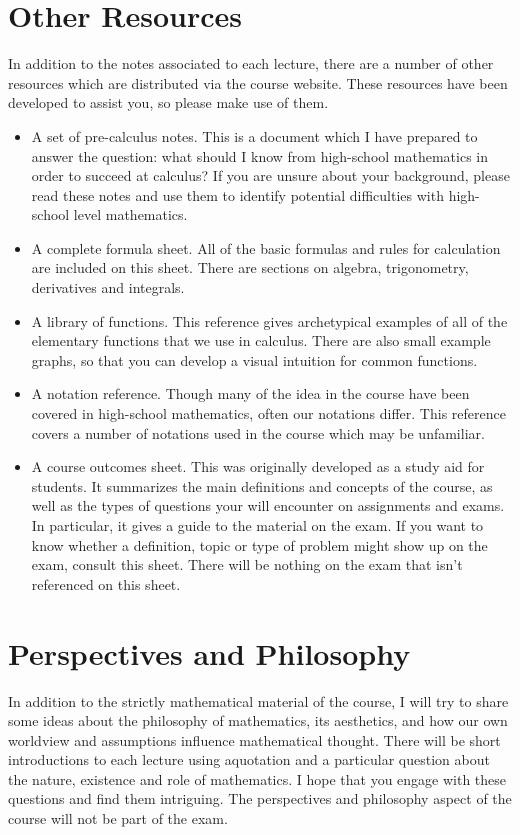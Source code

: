 \documentclass[fleqn]{report}
\begin{document}
\section{Other Resources}
\label{resources}

In addition to the notes associated to each lecture, there are
a number of other resources which are distributed via
the course website. These resources have been developed to
assist you, so please make use of them. 

\begin{itemize}
\item A set of pre-calculus notes. This is a document
which I have prepared to answer the question: what should I
know from high-school mathematics in order to succeed at
calculus? If you are unsure about your background, please
read these notes and use them to identify potential
difficulties with high-school level mathematics. 
\item A complete formula sheet. All of the basic formulas and
rules for calculation are included on this sheet. There are
sections on algebra, trigonometry, derivatives and integrals.
\item A library of functions. This reference gives
archetypical examples of all of the elementary functions that
we use in calculus. There are also small example graphs, so
that you can develop a visual intuition for common functions.
\item A notation reference. Though many of the idea in the
course have been covered in high-school mathematics, often our
notations differ. This reference covers a number of notations
used in the course which may be unfamiliar. 
\item A course outcomes sheet. This was originally
developed as a study aid for students. It summarizes the main
definitions and concepts of the course, as well as the types
of questions your will encounter on assignments and exams. In
particular, it gives a guide to the material on the exam. If
you want to know whether a definition, topic or type of
problem might show up on the exam, consult this sheet. There
will be nothing on the exam that isn't referenced on this
sheet.
\end{itemize}

\section{Perspectives and Philosophy}
\label{philosophy}

In addition to the strictly mathematical material of the
course, I will try to share some ideas about the philosophy of
mathematics, its aesthetics, and how our own worldview and
assumptions influence mathematical thought.
There will be short introductions to each lecture 
using aquotation and a particular question about the
nature, existence and role of mathematics. I hope that
you engage with these questions and find them intriguing. The
perspectives and philosophy aspect of the course will not be
part of the exam.
\end{document}
